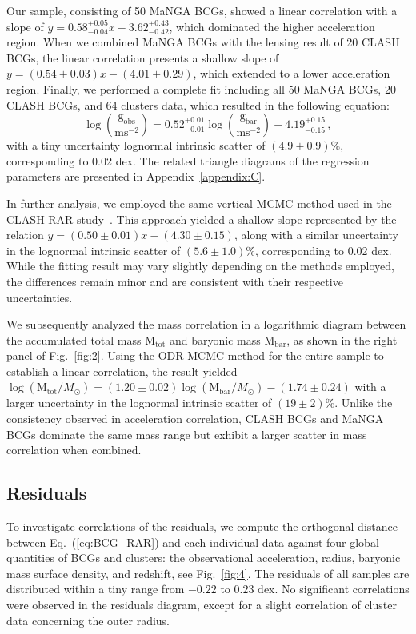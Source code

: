\documentclass[a4paper, two-column, twocolappendix]{aa}
\newcommand{\percent}{\ensuremath{\%}}
\newcommand{\Msun}{M_\odot}
\newcommand{\Mtot}{\mathrm{M}_\mathrm{tot}}
\newcommand{\Mbar}{\mathrm{M}_\mathrm{bar}}
\newcommand{\gbar}{\mathrm{g}_\mathrm{bar}}
\newcommand{\gobs}{\mathrm{g}_\mathrm{obs}}
\begin{document}
Our sample, consisting of 50 MaNGA BCGs, showed a linear correlation with a slope of $y=0.58^{+0.05}_{-0.04}x-3.62^{+0.43}_{-0.42}$, which dominated the higher acceleration region. 
When we combined MaNGA BCGs with the lensing result of 20 CLASH BCGs, the linear correlation presents a shallow slope of $y=(0.54\pm0.03)x-(4.01\pm0.29)$, which extended to a lower acceleration region.
Finally, we performed a complete fit including all 50 MaNGA BCGs, 20 CLASH BCGs, and 64 clusters data, which resulted in the following equation:
\begin{equation}\label{eq:BCG_RAR}
 \log\left(\frac{\gobs}{\mathrm{ms}^{-2}}\right)=0.52^{+0.01}_{-0.01}\log\left(\frac{\gbar}{\mathrm{ms}^{-2}}\right)-4.19^{+0.15}_{-0.15}\,,
\end{equation}
 with a tiny uncertainty lognormal intrinsic scatter of $(4.9\pm0.9)\percent$, corresponding to 0.02 dex.
The related triangle diagrams of the regression parameters are presented in Appendix~\ref{appendix:C}.


In further analysis, we employed the same vertical MCMC method used in the CLASH RAR study~\citep{Tian20}. 
This approach yielded a shallow slope represented by the relation $y=(0.50\pm0.01)x-(4.30\pm0.15)$, 
 along with a similar uncertainty in the lognormal intrinsic scatter of $(5.6\pm1.0)\percent$, corresponding to 0.02 dex. 
While the fitting result may vary slightly depending on the methods employed, 
 the differences remain minor and are consistent with their respective uncertainties. 

 
We subsequently analyzed the mass correlation in a logarithmic diagram 
 between the accumulated total mass $\Mtot$ and baryonic mass $\Mbar$, 
 as shown in the right panel of Fig.~\ref{fig:2}. 
Using the ODR MCMC method for the entire sample to establish a linear correlation, 
 the result yielded $\log(\Mtot/\Msun)=(1.20\pm0.02)\log(\Mbar/\Msun)-(1.74\pm0.24)$ 
 with a larger uncertainty in the lognormal intrinsic scatter of $(19\pm2)\percent$. 
Unlike the consistency observed in acceleration correlation, 
 CLASH BCGs and MaNGA BCGs dominate the same mass range but exhibit a larger scatter 
 in mass correlation when combined.

\subsection{Residuals}
To investigate correlations of the residuals, we compute the orthogonal distance between Eq.~(\ref{eq:BCG_RAR}) and each individual data against four global quantities of BCGs and clusters: the observational acceleration, radius, baryonic mass surface density, and redshift, see Fig.~\ref{fig:4}. 
The residuals of all samples are distributed within a tiny range from $-0.22$ to $0.23$ dex.
No significant correlations were observed in the residuals diagram, except for a slight correlation
of cluster data concerning the outer radius.
\end{document}
